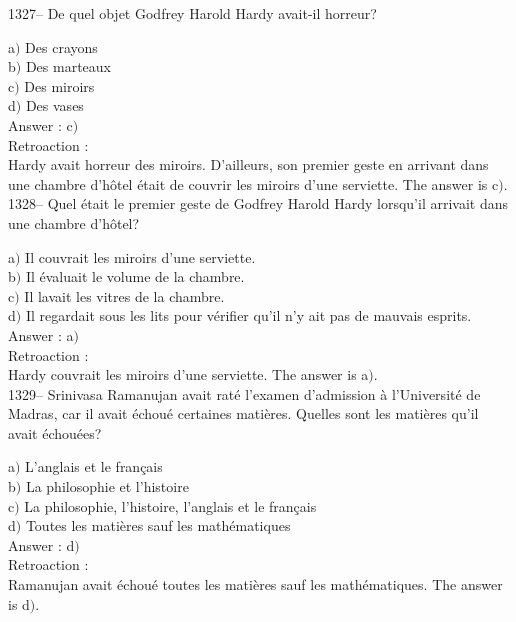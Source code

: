 ﻿\documentclass[letterpaper, 12pt]{article}
\begin{document}
1327-- De quel objet Godfrey Harold Hardy avait-il horreur?

a$)$ Des crayons \\
b$)$ Des marteaux \\
c$)$ Des miroirs \\
d$)$ Des vases\\

Answer : c$)$\\

Retroaction : \\
Hardy avait horreur des miroirs. D'ailleurs, son premier geste en
arrivant dans une chambre d'h\^otel \'etait de couvrir les miroirs
d'une serviette.
The answer is  c$)$.\\

1328-- Quel \'etait le premier geste de Godfrey Harold Hardy
lorsqu'il arrivait dans une chambre d'h\^otel?

a$)$ Il couvrait les miroirs d'une serviette. \\
b$)$ Il \'evaluait le volume de la chambre. \\
c$)$ Il lavait les vitres de la chambre. \\
d$)$ Il regardait sous les lits pour v\'erifier qu'il n'y ait pas de mauvais
esprits.\\

Answer : a$)$\\

Retroaction : \\
Hardy couvrait les miroirs d'une serviette.
The answer is  a$)$.\\

1329-- Srinivasa Ramanujan avait rat\'e l'examen d'admission \`a
l'Universit\'e de Madras, car il avait \'echou\'e certaines
mati\`eres. Quelles sont les mati\`eres qu'il avait \'echou\'ees?

a$)$ L'anglais et le fran\c cais \\
b$)$ La philosophie et l'histoire \\
c$)$ La philosophie, l'histoire, l'anglais et le fran\c cais \\
d$)$ Toutes les mati\`eres sauf les math\'ematiques\\

Answer : d$)$\\

Retroaction : \\
Ramanujan avait \'echou\'e toutes les mati\`eres sauf les
math\'ematiques.
The answer is  d$)$.\\
\end{document}

